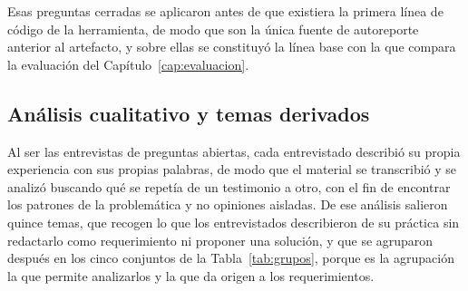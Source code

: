 Esas preguntas cerradas se aplicaron antes de que existiera la primera línea de
código de la herramienta, de modo que son la única fuente de autoreporte
anterior al artefacto, y sobre ellas se constituyó la línea base con la que
compara la evaluación del Capítulo~\ref{cap:evaluacion}.

\subsection{Análisis cualitativo y temas derivados}
\label{sec:analisis-cualitativo}

Al ser las entrevistas de preguntas abiertas, cada entrevistado describió su
propia experiencia con sus propias palabras, de modo que el material se
transcribió y se analizó buscando qué se repetía de un testimonio a otro,
con el fin de encontrar los patrones de la problemática y no opiniones
aisladas. De ese análisis salieron quince temas, que recogen lo que los
entrevistados describieron de su práctica sin redactarlo como requerimiento ni
proponer una solución, y que se agruparon después en los cinco conjuntos de la
Tabla~\ref{tab:grupos}, porque es la agrupación la que permite analizarlos y la
que da origen a los requerimientos.

